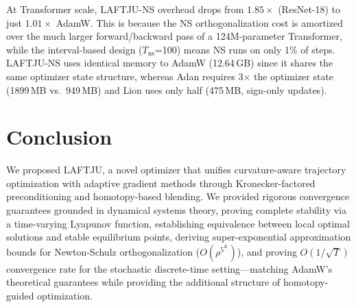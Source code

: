 \documentclass[10pt,twocolumn]{article}
\newcommand{\method}{LAFTJU}
\begin{document}
At Transformer scale, \method{}-NS overhead drops from $1.85\times$ (ResNet-18) to just $\mathbf{1.01\times}$ AdamW. This is because the NS orthogonalization cost is amortized over the much larger forward/backward pass of a 124M-parameter Transformer, while the interval-based design ($T_\mathrm{ns}$=100) means NS runs on only 1\% of steps. \method{}-NS uses identical memory to AdamW (12.64\,GB) since it shares the same optimizer state structure, whereas Adan requires 3$\times$ the optimizer state (1899\,MB vs.\ 949\,MB) and Lion uses only half (475\,MB, sign-only updates).

\section{Conclusion}

We proposed \method{}, a novel optimizer that unifies curvature-aware trajectory optimization with adaptive gradient methods through Kronecker-factored preconditioning and homotopy-based blending. We provided rigorous convergence guarantees grounded in dynamical systems theory, proving complete stability via a time-varying Lyapunov function, establishing equivalence between local optimal solutions and stable equilibrium points, deriving super-exponential approximation bounds for Newton-Schulz orthogonalization ($O(\rho^{5^K})$), and proving $O(1/\sqrt{T})$ convergence rate for the stochastic discrete-time setting---matching AdamW's theoretical guarantees while providing the additional structure of homotopy-guided optimization.
\end{document}
